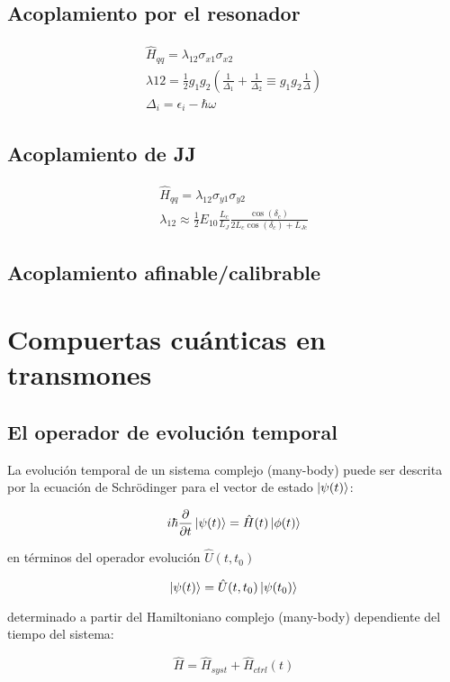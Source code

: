 \subsection{Acoplamiento por el resonador}
\begin{align*}
\hat{H}_{qq} = \lambda_{1 2} \sigma_{x1} \sigma_{x2} \\
\lambda{1 2} = \frac{1}{2} g_1 g_2 (\frac{1}{\Delta_1} + \frac{1}{\Delta_2} \equiv g_1 g_2 \frac{1}{\Delta}) \\
\Delta_i = \epsilon_i - \hbar \omega
\end{align*}

\subsection{Acoplamiento de JJ}
\begin{align*}
\hat{H}_{qq} = \lambda_{1 2} \sigma_{y1} \sigma_{y2} \\
\lambda_{1 2} \approx \frac{1}{2} E_{1 0} \frac{L_c}{L_J} \frac{\cos(\delta_c)}{2L_c \cos(\delta_c) + L_{J c}}
\end{align*}

\subsection{Acoplamiento afinable/calibrable}

\section{Compuertas cuánticas en transmones}

\subsection{El operador de evolución temporal}
La evolución temporal de un sistema complejo (many-body) puede ser descrita por la ecuación de Schrödinger para el vector de estado $\ket{\psi(t)}$:

\[
i \hbar \frac{\partial}{\partial t} \ket{\psi(t)} = \hat{H}(t) \ket{\phi(t)}
\]

en términos del operador evolución $\hat{U}(t,t_0)$

\[
\ket{\psi(t)} = \hat{U}(t,t_0) \ket{\psi(t_0)}
\]

determinado a partir del Hamiltoniano complejo (many-body) dependiente del tiempo del sistema:

\[
\hat{H} = \hat{H}_{syst} + \hat{H}_{ctrl}(t)
\]

